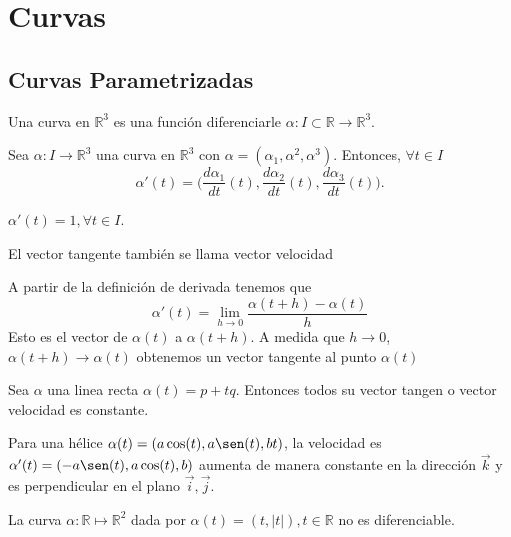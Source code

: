 \chapter{Curvas}
\section{Curvas Parametrizadas}

\begin{defn}[Curva]
  Una curva en $\mathbb{R}^{3}$ es una función diferenciarle $\alpha: I \subset \mathbb{R} \to \mathbb{R}^{3}$.
\end{defn}

\begin{defn}
  Sea $\alpha: I \to \mathbb{R}^{3}$ una curva en $\mathbb{R}^{3}$ con $\alpha = (\alpha_{1}, \alpha^{2}, \alpha^{3})$. Entonces, $\forall t \in I$
  \[ 
    \alpha'(t) = \big ( \frac{d{\alpha_{1}}}{d{t}}(t),\frac{d{\alpha_{2}}}{d{t}}(t),\frac{d{\alpha_{3}}}{d{t}}(t) \big ).
  \] 
\end{defn}

\begin{obs}
  $\alpha'(t) = 1, \forall t \in I$.
\end{obs}

\begin{obs}
  El vector tangente también se llama vector velocidad
\end{obs}

\begin{obs}
  A partir de la definición de derivada tenemos que
  \[ 
    \alpha'(t) = \lim_{h \to 0} \frac{\alpha(t+ h) - \alpha(t)}{h}
  \] 
  Esto es el vector de $\alpha(t)$ a $\alpha(t + h)$. A medida que $h \rightarrow 0$, $\alpha(t+h) \rightarrow \alpha(t)$ obtenemos un vector tangente al punto $\alpha(t)$
\end{obs}

\begin{ejm}
  Sea $\alpha$ una linea recta $\alpha(t) = p+ tq$. Entonces todos su vector tangen o vector velocidad es constante. 
\end{ejm}

\begin{ejm}
  Para una hélice $\alpha(t) = ( a \cos(t), a \sen(t), bt )$, la velocidad es $\alpha'(t) = ( -a \sen(t), a \cos(t), b)$ aumenta de manera constante en la dirección $\vec{k}$ y es perpendicular en el plano $\vec{i}, \vec{j}$.
\end{ejm}

\begin{ejm}
  La curva $\alpha: \mathbb{R} \mapsto \mathbb{R}^{2}$ dada por $\alpha(t) = ( t, |t| ), t \in \mathbb{R}$ no es diferenciable.
\end{ejm}

